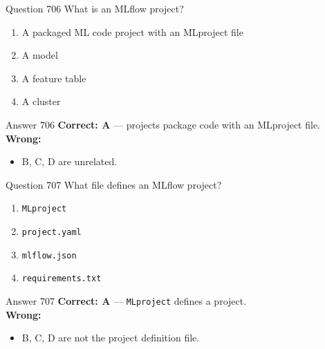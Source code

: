 \documentclass[aspectratio=169,11pt]{beamer}
\begin{document}
	\begin{frame}{Question 706}
		What is an MLflow project?
		\begin{enumerate}[label=\Alph*.]
			\item A packaged ML code project with an MLproject file
			\item A model
			\item A feature table
			\item A cluster
		\end{enumerate}
	\end{frame}
	\begin{frame}{Answer 706}
		\textbf{Correct: A} --- projects package code with an MLproject file.\\
		\vspace{0.5em}
		\textbf{Wrong:}
		\begin{itemize}
			\item B, C, D are unrelated.
		\end{itemize}
	\end{frame}
	
	\begin{frame}{Question 707}
		What file defines an MLflow project?
		\begin{enumerate}[label=\Alph*.]
			\item \texttt{MLproject}
			\item \texttt{project.yaml}
			\item \texttt{mlflow.json}
			\item \texttt{requirements.txt}
		\end{enumerate}
	\end{frame}
	\begin{frame}{Answer 707}
		\textbf{Correct: A} --- \texttt{MLproject} defines a project.\\
		\vspace{0.5em}
		\textbf{Wrong:}
		\begin{itemize}
			\item B, C, D are not the project definition file.
		\end{itemize}
	\end{frame}
	
\end{document}
